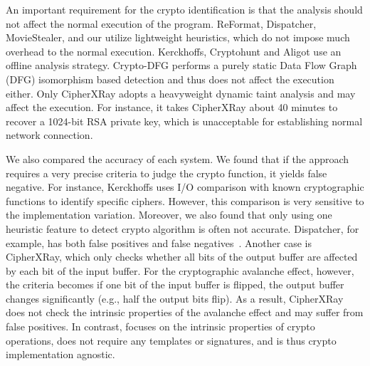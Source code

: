 An important requirement for the crypto identification is that the analysis should not affect the normal execution of the program.
\textsf{\small ReFormat}, \textsf{\small Dispatcher}, \textsf{\small MovieStealer}, and our \sysname utilize lightweight heuristics, which do not impose much overhead to the normal execution.
\textsf{\small Kerckhoffs}, \textsf{\small Cryptohunt} and \textsf{\small Aligot} use an offline analysis strategy. %
\textsf{\small Crypto-DFG} performs a purely static Data Flow Graph (DFG) isomorphism based detection and thus does not affect the execution either.
Only \textsf{\small CipherXRay} adopts a heavyweight dynamic taint analysis and may affect the execution. %
For instance, it takes CipherXRay about 40 minutes to recover a 1024-bit \textsf{\small RSA} private key, which is unacceptable for establishing normal network connection.

We also compared the accuracy of each system.
We found that if the approach requires a very precise criteria to judge the crypto function, it yields false negative.
For instance, \textsf{\small Kerckhoffs} uses I/O comparison with known cryptographic functions to identify specific ciphers.
However, this comparison is very sensitive to the implementation variation. %
Moreover, we also found that only using one heuristic feature to detect crypto algorithm is often not accurate.
\textsf{\small Dispatcher}, for example, has both false positives and false negatives~\cite{matenaar2012cis,grobert2011automated}.
Another case is \textsf{\small CipherXRay}, %
which only checks whether all bits of the output buffer are affected by each bit of the input buffer. For the cryptographic avalanche effect, however, the criteria becomes if one bit of the input buffer is flipped, the output buffer changes significantly (e.g., half the output bits flip).
As a result, \textsf{\small CipherXRay} does not check the intrinsic properties of the avalanche effect and may suffer from false positives. In contrast, \sysname focuses on the intrinsic properties of crypto operations, does not require any templates or signatures, and is thus crypto implementation agnostic.

